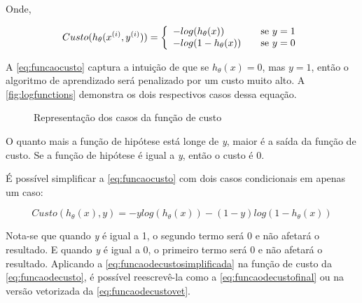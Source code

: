 Onde,


\begin{align}
 Custo(h_{\theta}(x^{(i)}, y^{(i)})) = \left\{
  \begin{array}{l l} 
    -log(h_{\theta}(x)) & \quad \text{se } y=1 \\
    -log(1 - h_{\theta}(x)) & \quad \text{se } y=0 \label{eq:funcaocusto}
  \end{array} \right.
\end{align}


A \autoref{eq:funcaocusto} captura a intuição de que se $h_\theta(x) = 0$, mas $y = 1$, então o algoritmo de aprendizado será penalizado por um custo muito alto. A \autoref{fig:logfunctions} demonstra os dois respectivos casos dessa equação.


\begin{figure}[!htb]
  \caption{Representação dos casos da função de custo}
  \label{fig:logfunctions}
  \begin{center}
  \end{center}
\end{figure}


O quanto mais a função de hipótese está longe de \textit{y}, maior é a saída da função de custo. Se a função de hipótese é igual a \textit{y}, então o custo é 0.

É possível simplificar a \autoref{eq:funcaocusto} com dois casos condicionais em apenas um caso:

\begin{equation} 
\label{eq:funcaodecustosimplificada}
Custo(h_{\theta}(x), y) = -ylog(h_{\theta}(x)) - (1-y)log(1 - h_{\theta}(x))
\end{equation}

Nota-se que quando \textit{y} é igual a 1, o segundo termo será 0 e não afetará o resultado. E quando \textit{y} é igual a 0, o primeiro termo será 0 e não afetará o resultado. Aplicando a \autoref{eq:funcaodecustosimplificada} na função de custo da \autoref{eq:funcaodecusto}, é possível reescrevê-la como a \autoref{eq:funcaodecustofinal} ou na versão vetorizada da \autoref{eq:funcaodecustovet}.

